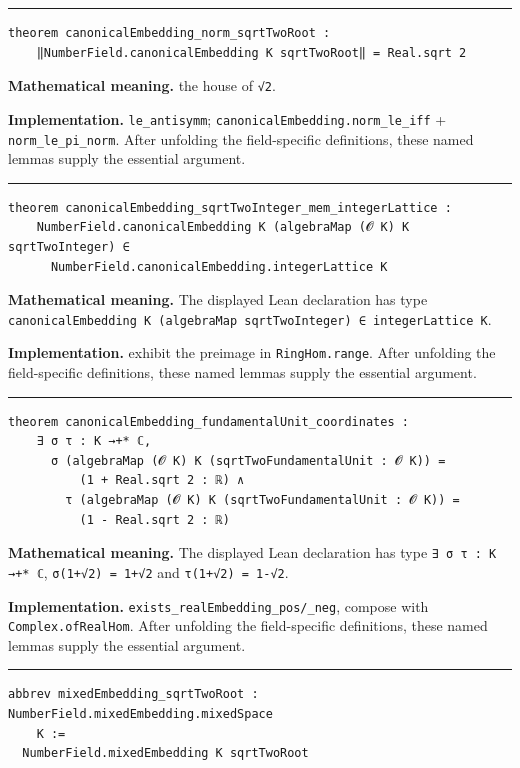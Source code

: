 \documentclass[UTF8,a4paper,11pt,fontset=fandol]{ctexart}
\theoremstyle{definition}
\newcommand{\statementsep}{\par\medskip\hrule\medskip}
\begin{document}
\statementsep
\begin{verbatim}
theorem canonicalEmbedding_norm_sqrtTwoRoot :
    ‖NumberField.canonicalEmbedding K sqrtTwoRoot‖ = Real.sqrt 2
\end{verbatim}
\noindent\textbf{Mathematical meaning.} the house of \texttt{√2}.\par
\noindent\textbf{Implementation.} \texttt{le\_\allowbreak{}antisymm}; \texttt{canonicalEmbedding.\allowbreak{}norm\_\allowbreak{}le\_\allowbreak{}iff} + \texttt{norm\_\allowbreak{}le\_\allowbreak{}pi\_\allowbreak{}norm}. After unfolding the field-specific definitions, these named lemmas supply the essential argument.\par
\statementsep
\begin{verbatim}
theorem canonicalEmbedding_sqrtTwoInteger_mem_integerLattice :
    NumberField.canonicalEmbedding K (algebraMap (𝓞 K) K sqrtTwoInteger) ∈
      NumberField.canonicalEmbedding.integerLattice K
\end{verbatim}
\noindent\textbf{Mathematical meaning.} The displayed Lean declaration has type \texttt{canonicalEmbedding K (algebraMap sqrtTwoInteger) ∈ integerLattice K}.\par
\noindent\textbf{Implementation.} exhibit the preimage in \texttt{RingHom.\allowbreak{}range}. After unfolding the field-specific definitions, these named lemmas supply the essential argument.\par
\statementsep
\begin{verbatim}
theorem canonicalEmbedding_fundamentalUnit_coordinates :
    ∃ σ τ : K →+* ℂ,
      σ (algebraMap (𝓞 K) K (sqrtTwoFundamentalUnit : 𝓞 K)) =
          (1 + Real.sqrt 2 : ℝ) ∧
        τ (algebraMap (𝓞 K) K (sqrtTwoFundamentalUnit : 𝓞 K)) =
          (1 - Real.sqrt 2 : ℝ)
\end{verbatim}
\noindent\textbf{Mathematical meaning.} The displayed Lean declaration has type \texttt{∃ σ τ : K →+* ℂ}, \texttt{σ(1+√2) = 1+√2} and \texttt{τ(1+√2) = 1-√2}.\par
\noindent\textbf{Implementation.} \texttt{exists\_\allowbreak{}realEmbedding\_\allowbreak{}pos/\allowbreak{}\_\allowbreak{}neg}, compose with \texttt{Complex.\allowbreak{}ofRealHom}. After unfolding the field-specific definitions, these named lemmas supply the essential argument.\par
\statementsep
\begin{verbatim}
abbrev mixedEmbedding_sqrtTwoRoot : NumberField.mixedEmbedding.mixedSpace
    K :=
  NumberField.mixedEmbedding K sqrtTwoRoot
\end{verbatim}
\end{document}
